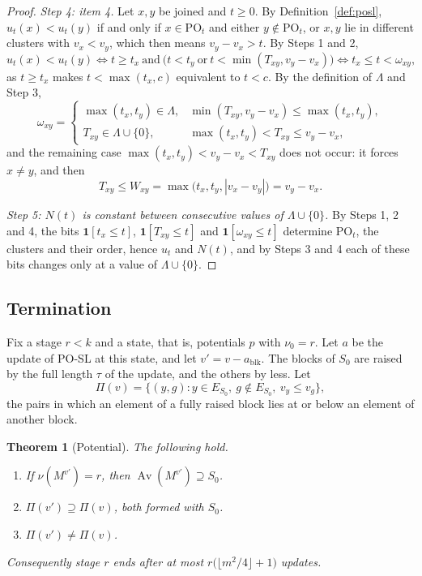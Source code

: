 \documentclass[11pt]{article}
\newtheorem{theorem}{Theorem}[section]
\newcommand{\blk}{\operatorname{blk}}
\newcommand{\PO}{\mathrm{PO}}
\newcommand{\Av}{\operatorname{Av}}
\begin{document}
\begin{proof}
\emph{Step 4: item 4.}  Let $x,y$ be joined and $t\ge0$.  By
Definition~\ref{def:posl}, $u_t(x)<u_t(y)$ if and only if $x\in\PO_t$ and either
$y\notin\PO_t$, or $x,y$ lie in different clusters with $v_x<v_y$, which then means
$v_y-v_x>t$.  By Steps 1 and 2,
\[
  u_t(x)<u_t(y)\iff t\ge t_x\ \text{and}\
  \bigl(t<t_y\ \text{or}\ t<\min(T_{xy},v_y-v_x)\bigr)\iff t_x\le t<\omega_{xy},
\]
as $t\ge t_x$ makes $t<\max(t_x,c)$ equivalent to $t<c$.  By the definition of
$\Lambda$ and Step 3,
\[
  \omega_{xy}=\begin{cases}
    \max(t_x,t_y)\in\Lambda,&\min(T_{xy},v_y-v_x)\le\max(t_x,t_y),\\
    T_{xy}\in\Lambda\cup\{0\},&\max(t_x,t_y)<T_{xy}\le v_y-v_x,
  \end{cases}
\]
and the remaining case $\max(t_x,t_y)<v_y-v_x<T_{xy}$ does not occur: it forces
$x\ne y$, and then
\[
  T_{xy}\le W_{xy}=\max\bigl(t_x,t_y,|v_x-v_y|\bigr)=v_y-v_x.
\]

\emph{Step 5: $N(t)$ is constant between consecutive values of $\Lambda\cup\{0\}$.}  By Steps 1, 2 and 4, the bits $\mathbf 1[t_x\le t]$,
$\mathbf 1[T_{xy}\le t]$ and $\mathbf 1[\omega_{xy}\le t]$ determine $\PO_t$, the
clusters and their order, hence $u_t$ and $N(t)$, and by Steps 3 and 4 each of these
bits changes only at a value of $\Lambda\cup\{0\}$.
\end{proof}

\subsection{Termination}
\label{sec:term}

Fix a stage $r<k$ and a state, that is, potentials $p$ with $\nu_0=r$.  Let $a$ be
the update of PO-SL at this state, and let $v'=v-a_{\blk}$.  The blocks of $S_0$ are raised by the full
length $\tau$ of the update, and the others by less.  Let
\[
  \Pi(v)=\bigl\{(y,g):y\in E_{S_0},\ g\notin E_{S_0},\ v_y\le v_g\bigr\},
\]
the pairs in which an element of a fully raised block lies at or below an
element of another block.

\begin{theorem}[Potential]
\label{thm:potential}
The following hold.
\begin{enumerate}
  \item If $\nu(M^{v'})=r$, then $\Av(M^{v'})\supseteq S_0$.
  \item $\Pi(v')\supseteq\Pi(v)$, both formed with $S_0$.
  \item $\Pi(v')\ne\Pi(v)$.
\end{enumerate}
Consequently stage $r$ ends after at most $r\bigl(\lfloor m^{2}/4\rfloor+1\bigr)$
updates.
\end{theorem}
\end{document}
